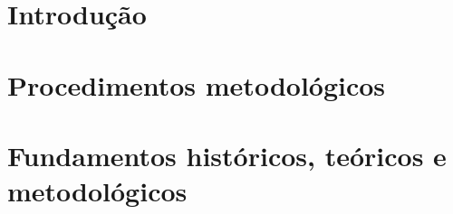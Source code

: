 \documentclass[
	11pt,				%
	openright,			%
	oneside,			%
	a4paper,			%
	english,			%
	french,				%
	spanish,			%
	brazil,				%
	]{abntex2}
\begin{document}
%
%
%
%

\tableofcontents*
\cleardoublepage



\textual

\chapter[Introdução]{Introdução}


\chapter{Procedimentos metodológicos}


\chapter{Fundamentos históricos, teóricos e metodológicos}
%
%
%
%
%
\end{document}

